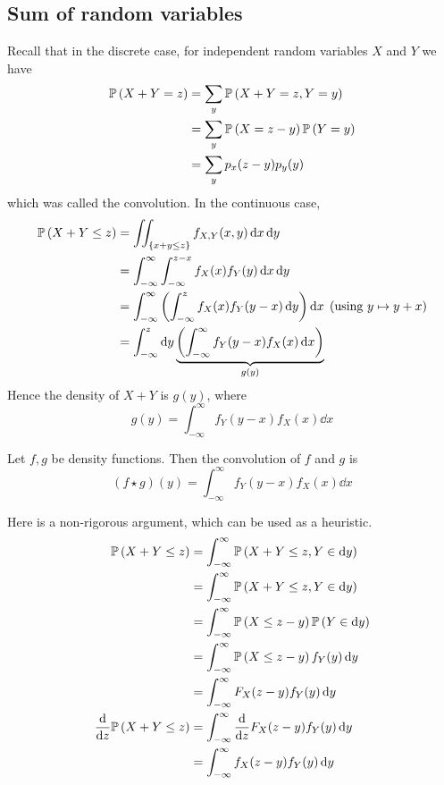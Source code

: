 \subsection{Sum of random variables}
Recall that in the discrete case, for independent random variables \(X\) and \(Y\) we have
\begin{align*}
	\mathbb{P}\left({X+Y = z}\right) &= \sum_y \mathbb{P}\left({X+Y = z, Y=y}\right) \\
	&= \sum_y \mathbb{P}\left({X = z-y}\right) \mathbb{P}\left({Y = y}\right) \\
	&= \sum_y p_x(z-y) p_y(y)
\end{align*}
which was called the convolution.
In the continuous case,
\begin{align*}
	\mathbb{P}\left({X+Y \leq z}\right) & = \iint_{\{ x+y \leq z \}} f_{X, Y}(x, y) \dd{x}\dd{y}                                                                   \\
	                  & = \int_{-\infty}^\infty \int_{-\infty}^{z-x} f_X(x)f_Y(y) \dd{x}\dd{y}                                                   \\
	                  & = \int_{-\infty}^\infty \left( \int_{-\infty}^{z} f_X(x)f_Y(y-x) \dd{y} \right) \dd{x}\; (\text{using } y \mapsto y + x) \\
	                  & = \int_{-\infty}^z \dd{y} \underbrace{\left( \int_{-\infty}^\infty f_Y(y-x) f_X(x) \dd{x} \right)}_{g(y)}
\end{align*}
Hence the density of \(X+Y\) is \(g(y)\), where
\[
	g(y) = \int_{-\infty}^\infty f_Y(y-x) f_X(x) \dd{x}
\]
\begin{definition}
	Let \(f, g\) be density functions.
	Then the convolution of \(f\) and \(g\) is
	\[
		(f \star g)(y) = \int_{-\infty}^\infty f_Y(y-x) f_X(x) \dd{x}
	\]
\end{definition}
Here is a non-rigorous argument, which can be used as a heuristic.
\begin{align*}
	\mathbb{P}\left({X + Y \leq z}\right)        & = \int_{-\infty}^\infty \mathbb{P}\left({X + Y \leq z, Y \in \dd{y}}\right)      \\
	                           & = \int_{-\infty}^\infty \mathbb{P}\left({X + Y \leq z, Y \in \dd{y}}\right)      \\
	                           & = \int_{-\infty}^\infty \mathbb{P}\left({X \leq z - y}\right)\mathbb{P}\left({Y \in \dd{y}}\right) \\
	                           & = \int_{-\infty}^\infty \mathbb{P}\left({X \leq z - y}\right)f_Y(y)\dd{y}        \\
	                           & = \int_{-\infty}^\infty F_X(z - y)f_Y(y)\dd{y}                 \\
	\dv{z} \mathbb{P}\left({X + Y \leq z}\right) & = \int_{-\infty}^\infty \dv{z} F_X(z - y)f_Y(y)\dd{y}          \\
	                           & = \int_{-\infty}^\infty f_X(z - y)f_Y(y)\dd{y}                 \\
\end{align*}

